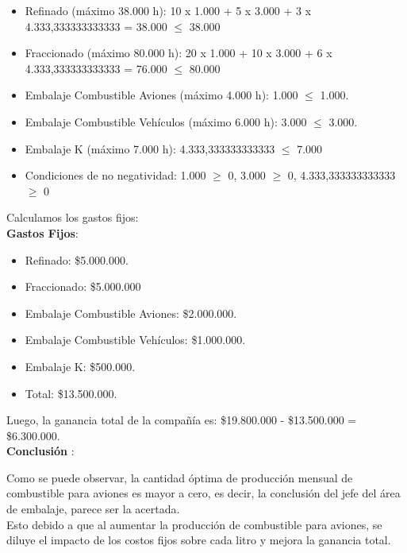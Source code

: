 \documentclass[10pt,a4paper]{article}
\begin{document}
\begin{enumerate}[label=\textbf{\sffamily\large\arabic*.}]
\begin{itemize}
        \item Refinado (máximo 38.000 h): 10 x 1.000 + 5 x 3.000 + 3 x 4.333,333333333333 = 38.000 $\leq$ 38.000
        \item Fraccionado (máximo 80.000 h): 20 x 1.000 + 10 x 3.000 + 6 x 4.333,333333333333 = 76.000 $\leq$ 80.000
        \item Embalaje Combustible Aviones (máximo 4.000 h): 1.000 $\leq$ 1.000.
        \item Embalaje Combustible Vehículos (máximo 6.000 h): 3.000 $\leq$ 3.000.
        \item Embalaje K (máximo 7.000 h): 4.333,333333333333 $\leq$ 7.000
        \item Condiciones de no negatividad: 1.000 $\geq$ 0, 3.000 $\geq$ 0, 4.333,333333333333 $\geq$ 0 \\

    \end{itemize}

    Calculamos los gastos fijos:\\

    \textbf{Gastos Fijos}:

    \begin{itemize}

        \item Refinado: \$5.000.000.
        \item Fraccionado: \$5.000.000
        \item Embalaje Combustible Aviones: \$2.000.000.
        \item Embalaje Combustible Vehículos: \$1.000.000.
        \item Embalaje K: \$500.000.
        \item Total: \$13.500.000. \\

    \end{itemize}

    Luego, la ganancia total de la compañía es: \$19.800.000 - \$13.500.000 = \$6.300.000. \\

    \textbf{Conclusión }:

    Como se puede observar, la cantidad óptima de producción mensual de combustible para aviones es mayor a cero, es 
    decir, la conclusión del jefe del área de embalaje, parece ser la acertada. \\
    Esto debido a que al aumentar la producción de combustible para aviones, se diluye el impacto de los costos fijos sobre cada litro y 
    mejora la ganancia total. \\



\end{enumerate}
\end{document}
